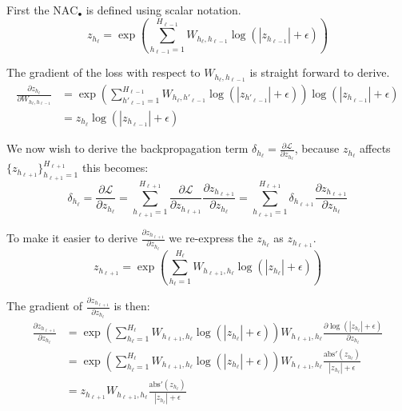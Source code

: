 First the $\textrm{NAC}_\bullet$ is defined using scalar notation.
\begin{equation}
z_{h_\ell} = \exp\left(\sum_{h_{\ell-1}=1}^{H_{\ell-1}} W_{h_{\ell}, h_{\ell-1}} \log(|z_{h_{\ell-1}}| + \epsilon) \right)
\end{equation}

The gradient of the loss with respect to $W_{h_\ell, h_{\ell-1}}$ is straight forward to derive.
\begin{equation}
\begin{aligned}
\frac{\partial z_{h_\ell}}{\partial W_{h_\ell, h_{\ell-1}}} &= \exp\left(\sum_{h'_{\ell-1}=1}^{H_{\ell-1}} W_{h_{\ell}, h'_{\ell-1}} \log(|z_{h'_{\ell-1}}| + \epsilon) \right) \log(|z_{h_{\ell-1}}| + \epsilon) \\
&= z_{h_\ell} \log(|z_{h_{\ell-1}}| + \epsilon)
\end{aligned}
\end{equation}

We now wish to derive the backpropagation term $\delta_{h_\ell} = \frac{\partial \mathcal{L}}{\partial z_{h_\ell}}$, because $z_{h_\ell}$ affects $\{z_{h_{\ell+1}}\}_{h_{\ell+1}=1}^{H_{\ell+1}}$ this becomes:
\begin{equation}
\delta_{h_\ell} = \frac{\partial \mathcal{L}}{\partial z_{h_\ell}} = \sum_{h_{\ell+1}=1}^{H_{\ell+1}} \frac{\partial \mathcal{L}}{\partial z_{h_{\ell+1}}} \frac{\partial z_{h_{\ell+1}}}{\partial z_{h_\ell}} = \sum_{h_{\ell+1}=1}^{H_{\ell+1}} \delta_{h_{\ell+1}} \frac{\partial z_{h_{\ell+1}}}{\partial z_{h_\ell}}
\end{equation}

To make it easier to derive $\frac{\partial z_{h_{\ell+1}}}{\partial z_{h_\ell}}$ we re-express the $z_{h_\ell}$ as $z_{h_{\ell+1}}$.
\begin{equation}
z_{h_{\ell+1}} = \exp\left(\sum_{h_{\ell}=1}^{H_{\ell}} W_{h_{\ell+1}, h_{\ell}} \log(|z_{h_{\ell}}| + \epsilon) \right)
\end{equation}

The gradient of $\frac{\partial z_{h_{\ell+1}}}{\partial z_{h_\ell}}$ is then:
\begin{equation}
\begin{aligned}
\frac{\partial z_{h_{\ell+1}}}{\partial z_{h_\ell}} &= \exp\left(\sum_{h_{\ell}=1}^{H_{\ell}} W_{h_{\ell+1}, h_{\ell}} \log(|z_{h_{\ell}}| + \epsilon) \right) W_{h_{\ell+1}, h_{\ell}} \frac{\partial \log(|z_{h_{\ell}}| + \epsilon)}{\partial z_{h_\ell}} \\
&= \exp\left(\sum_{h_{\ell}=1}^{H_{\ell}} W_{h_{\ell+1}, h_{\ell}} \log(|z_{h_{\ell}}| + \epsilon) \right) W_{h_{\ell+1}, h_{\ell}} \frac{\mathrm{abs}'(z_{h_{\ell}})}{|z_{h_{\ell}}| + \epsilon} \\
&= z_{h_{\ell+1}} W_{h_{\ell+1}, h_{\ell}} \frac{\mathrm{abs}'(z_{h_{\ell}})}{|z_{h_{\ell}}| + \epsilon} 
\end{aligned}
\end{equation}

